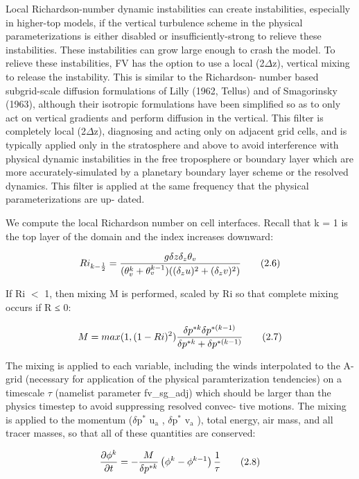Local Richardson-\/number dynamic instabilities can create instabilities, especially in higher-\/top models, if the vertical turbulence scheme in the physical parameterizations is either disabled or insufficiently-\/strong to relieve these instabilities. These instabilities can grow large enough to crash the model. To relieve these instabilities, F\-V has the option to use a local (2{$\Delta$}z), vertical mixing to release the instability. This is similar to the Richardson-\/ number based subgrid-\/scale diffusion formulations of Lilly (1962, Tellus) and of Smagorinsky (1963), although their isotropic formulations have been simplified so as to only act on vertical gradients and perform diffusion in the vertical. This filter is completely local (2{$\Delta$}z), diagnosing and acting only on adjacent grid cells, and is typically applied only in the stratosphere and above to avoid interference with physical dynamic instabilities in the free troposphere or boundary layer which are more accurately-\/simulated by a planetary boundary layer scheme or the resolved dynamics. This filter is applied at the same frequency that the physical parameterizations are up-\/ dated.

We compute the local Richardson number on cell interfaces. Recall that k = 1 is the top layer of the domain and the index increases downward\-:

\[ Ri_{k-\frac{1}{2}} = \frac{g\delta z\delta_z\theta_v}{(\theta^{k}_{v}+\theta^{k-1}_{v})((\delta_z u)^2+(\delta_z v)^2)} \\ \tag {2.6} \]

If Ri $<$ 1, then mixing M is performed, scaled by Ri so that complete mixing occurs if R ≤ 0\-:

\[ M = max(1, (1-Ri)^2) \frac{\delta p^{*k}\delta p^{*(k-1)}}{\delta p^{*k} +\delta p^{*(k-1)}} \\ \tag {2.7} \]

The mixing is applied to each variable, including the winds interpolated to the A-\/grid (necessary for application of the physical paramterization tendencies) on a timescale {$\tau$} (namelist parameter {\ttfamily fv\-\_\-sg\-\_\-adj}) which should be larger than the physics timestep to avoid suppressing resolved convec-\/ tive motions. The mixing is applied to the momentum ({$\delta$}p$^{\mbox{$\ast$}}$  u$_{\mbox{a}}$ , {$\delta$}p$^{\mbox{$\ast$}}$  v$_{\mbox{a}}$ ), total energy, air mass, and all tracer masses, so that all of these quantities are conserved\-:

\[ \frac{\partial \phi^k}{\partial t} = - \frac{M}{\delta p^{*k} } \left(\phi^k - \phi^{k-1} \right) \frac{1}{\tau} \\ \tag {2.8} \]

